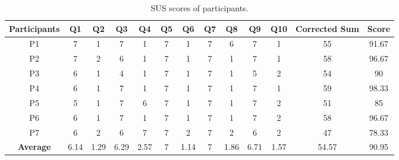 \begin{table}
    \centering
    \begin{tabular}{c c c c c c c c c c c c c}
        \hline
        \textbf{Participants} & \textbf{Q1} & \textbf{Q2} & \textbf{Q3} & \textbf{Q4} & \textbf{Q5} & \textbf{Q6} & \textbf{Q7} & \textbf{Q8} & \textbf{Q9} & \textbf{Q10} & \textbf{Corrected Sum} & \textbf{Score} \\
        \hline
        P1 & 7 & 1 & 7 & 1 & 7 & 1 & 7 & 6 & 7 & 1 & 55 & 91.67 \\
        \hline
        P2 & 7 & 2 & 6 & 1 & 7 & 1 & 7 & 1 & 7 & 1 & 58 & 96.67 \\
        \hline
        P3 & 6 & 1 & 4 & 1 & 7 & 1 & 7 & 1 & 5 & 2 & 54 & 90 \\
        \hline
        P4 & 6 & 1 & 7 & 1 & 7 & 1 & 7 & 1 & 7 & 1 & 59 & 98.33 \\
        \hline
        P5 & 5 & 1 & 7 & 6 & 7 & 1 & 7 & 1 & 7 & 2 & 51 & 85 \\
        \hline
        P6 & 6 & 1 & 7 & 1 & 7 & 1 & 7 & 1 & 7 & 2 & 58 & 96.67 \\
        \hline
        P7 & 6 & 2 & 6 & 7 & 7 & 2 & 7 & 2 & 6 & 2 & 47 & 78.33 \\
        \hline
        \textbf{Average} & 6.14 & 1.29 & 6.29 & 2.57 & 7 & 1.14 & 7 & 1.86 & 6.71 & 1.57 & 54.57 & 90.95 \\
        \hline
    \end{tabular}
    \vspace{1em}
    \caption{SUS scores of participants.}
    \label{table:sus_scoring}
\end{table}

